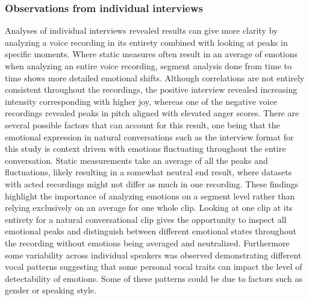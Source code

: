 \subsubsection{Observations from individual interviews}
Analyses of individual interviews revealed results can give more clarity by analyzing a voice recording in its entirety combined with looking at peaks in specific moments. Where static measures often result in an average of emotions when analyzing an entire voice recording, segment analysis done from time to time shows more detailed emotional shifts. Although correlations are not entirely consistent throughout the recordings, the positive interview revealed increasing intensity corresponding with higher joy, whereas one of the negative voice recordings revealed peaks in pitch aligned with elevated anger scores. 
There are several possible factors that can account for this result, one being that the emotional expression in natural conversations such as the interview format for this study is context driven with emotions fluctuating throughout the entire conversation. Static measurements take an average of all the peaks and fluctuations, likely resulting in a somewhat neutral end result, where datasets with acted recordings might not differ as much in one recording.
These findings highlight the importance of analyzing emotions on a segment level rather than relying exclusively on an average for one whole clip. Looking at one clip at its entirety for a natural conversational clip gives the opportunity to inspect all emotional peaks and distinguish between different emotional states throughout the recording without emotions being averaged and neutralized.
Furthermore some variability across individual speakers was observed demonstrating different vocal patterns suggesting that some personal vocal traits can impact the level of detectability of emotions. Some of these patterns could be due to factors such as gender or speaking style.


